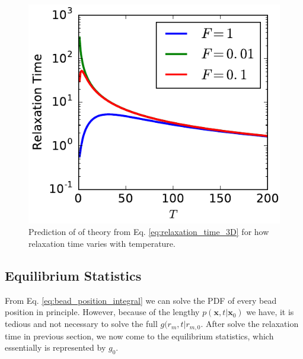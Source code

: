\documentclass[12pt,a4paper]{article}
\begin{document}
\begin{figure}[htpb]
    \centering
    \includegraphics[width=0.8\linewidth]{prediction.pdf}
    \caption{Prediction of of theory from Eq. \eqref{eq:relaxation_time_3D} for
        how relaxation time varies with temperature.}
    \label{fig:prediction}
\end{figure}

\subsection{Equilibrium Statistics}
\label{sub:equilibrium_statistics}

From Eq. \eqref{eq:bead_position_integral} we can solve the PDF of every bead
position in principle. However, because of the lengthy $p(\mathbf{x}, t |
\mathbf{x}_0)$ we have, it is tedious and not necessary to solve the full
$g(r_m, t | r_{m,0}$. After solve the relaxation time in previous section, we
now come to the equilibrium statistics, which essentially is represented
by $g_0$.
\end{document}
